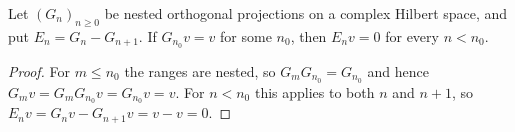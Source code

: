 \begin{lemma}
    \label{lem:martingale_difference_vanishing_below_level}
    \leanok
    Let $(G_n)_{n\geq0}$ be nested orthogonal projections on a complex
    Hilbert space, and put $E_n=G_n-G_{n+1}$. If $G_{n_0}v=v$ for some
    $n_0$, then $E_nv=0$ for every $n<n_0$.
\end{lemma}

\begin{proof}
    \leanok
    For $m\leq n_0$ the ranges are nested, so $G_mG_{n_0}=G_{n_0}$ and hence
    $G_mv=G_mG_{n_0}v=G_{n_0}v=v$. For $n<n_0$ this applies to both $n$ and
    $n+1$, so $E_nv=G_nv-G_{n+1}v=v-v=0$.
\end{proof}

